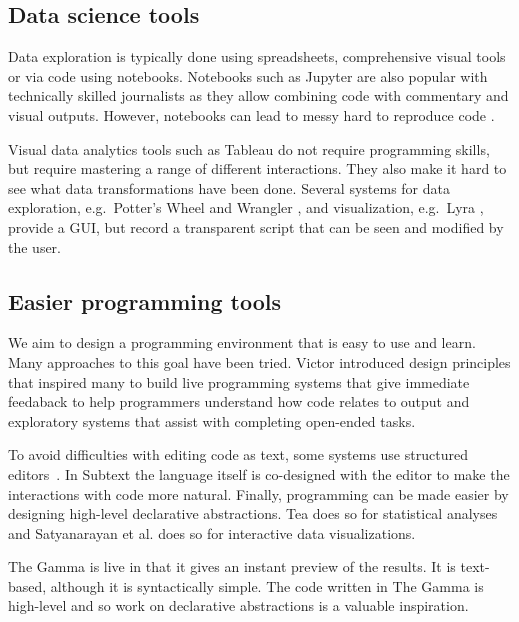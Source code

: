 \documentclass{sigchi}
\begin{document}

\subsection{Data science tools}
Data exploration is typically done using spreadsheets, comprehensive visual tools or
via code using notebooks. Notebooks such as Jupyter \cite{jupyter} are also popular with technically
skilled journalists as they allow combining code with commentary and visual outputs. However,
notebooks can lead to messy hard to reproduce code \cite{messes,wrattler}.

Visual data analytics tools \cite{control,vizdom} such as Tableau \cite{tableau} do not require
programming skills, but require mastering a range of different interactions. They also make it
hard to see what data transformations have been done. Several systems for data exploration,
e.g.~Potter's Wheel and Wrangler \cite{potter,wrangler}, and visualization, e.g.~Lyra \cite{lyra},
provide a GUI, but record a transparent script that can be seen and modified by the user.

\subsection{Easier programming tools}
We aim to design a programming environment that is easy to use and learn. Many approaches to this
goal have been tried. Victor \cite{learnable,principle} introduced design principles that
inspired many to build live programming systems \cite{review,liveroad,lighttable} that give
immediate feedaback to help programmers understand how code relates to output and
exploratory systems \cite{variolite,exploratory} that assist with completing open-ended tasks.

To avoid difficulties with editing code as text, some systems use structured editors~\cite{structure-based,livenut,lamdu}.
In Subtext \cite{subtext,directprog} the language itself is co-designed with the editor to make
the interactions with code more natural. Finally, programming can be made easier by designing
high-level declarative abstractions. Tea does so for statistical analyses \cite{tea} and
Satyanarayan et al. \cite{interactionviz,vegalite} does so for interactive data visualizations.

The Gamma is live in that it gives an instant preview of the results. It is text-based,
although it is syntactically simple. The code written in The Gamma is high-level and so work
on declarative abstractions is a valuable inspiration.
\end{document}
